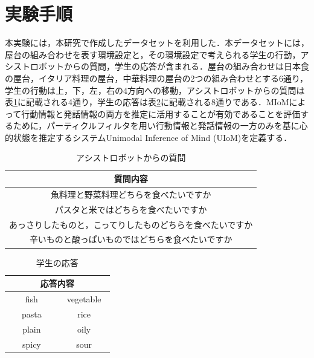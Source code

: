 \section{実験手順}

\par
本実験には，本研究で作成したデータセットを利用した．本データセットには，屋台の組み合わせを表す環境設定と，その環境設定で考えられる学生の行動，アシストロボットからの質問，学生の応答が含まれる．屋台の組み合わせは日本食の屋台，イタリア料理の屋台，中華料理の屋台の2つの組み合わせとする6通り，学生の行動は上，下，左，右の4方向への移動，アシストロボットからの質問は表\ref{tab:question}に記載される4通り，学生の応答は表\ref{tab:answer}に記載される8通りである．MIoMによって行動情報と発話情報の両方を推定に活用することが有効であることを評価するために，パーティクルフィルタを用い行動情報と発話情報の一方のみを基に心的状態を推定するシステムUnimodal Inference of Mind (UIoM)を定義する．

\begin{table}[htb]
  \begin{center}
  \caption{アシストロボットからの質問}
  \label{tab:question}
  \begin{tabular}{c} \hline
    質問内容\\\hline
    魚料理と野菜料理どちらを食べたいですか\\
    パスタと米ではどちらを食べたいですか\\
    あっさりしたものと，こってりしたものどちらを食べたいですか\\
    辛いものと酸っぱいものではどちらを食べたいですか\\\hline
  \end{tabular}
\end{center}
\end{table}

\begin{table}[htb]
  \begin{center}
  \caption{学生の応答}
  \label{tab:answer}
  \begin{tabular}{cc} \hline
    \multicolumn{2}{c}{応答内容}\\\hline
    　fish　&　vegetable　\\
    　pasta　&　rice　\\
    　plain　&　oily　\\
    　spicy　&　sour　\\\hline
  \end{tabular}
\end{center}
\end{table}

